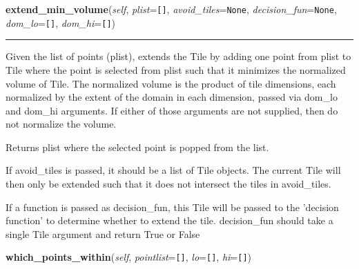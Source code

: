     \label{Tiling:Tile:extend_min_volume}

    \vspace{0.5ex}

\hspace{.8\funcindent}\begin{boxedminipage}{\funcwidth}

    \raggedright \textbf{extend\_min\_volume}(\textit{self}, \textit{plist}={\tt []}, \textit{avoid\_tiles}={\tt None}, \textit{decision\_fun}={\tt None}, \textit{dom\_lo}={\tt []}, \textit{dom\_hi}={\tt []})

    \vspace{-1.5ex}

    \rule{\textwidth}{0.5\fboxrule}
\setlength{\parskip}{2ex}
    Given the list of points (plist), extends the Tile by adding one point 
    from plist to Tile where the point is selected from plist such that it 
    minimizes the normalized volume of Tile. The normalized volume is the 
    product of tile dimensions, each normalized by the extent of the domain
    in each dimension, passed via dom\_lo and dom\_hi arguments. If either 
    of those arguments are not supplied, then do not normalize the volume.

    Returns plist where the selected point is popped from the list.

    If avoid\_tiles is passed, it should be a list of Tile objects. The 
    current Tile will then only be extended such that it does not intersect
    the tiles in avoid\_tiles.

    If a function is passed as decision\_fun, this Tile will be passed to 
    the 'decision function' to determine whether to extend the tile. 
    decision\_fun should take a single Tile argument and return True or 
    False

\setlength{\parskip}{1ex}
    \end{boxedminipage}

    \label{Tiling:Tile:which_points_within}

    \vspace{0.5ex}

\hspace{.8\funcindent}\begin{boxedminipage}{\funcwidth}

    \raggedright \textbf{which\_points\_within}(\textit{self}, \textit{pointlist}={\tt []}, \textit{lo}={\tt []}, \textit{hi}={\tt []})

\setlength{\parskip}{2ex}
\setlength{\parskip}{1ex}
    \end{boxedminipage}

